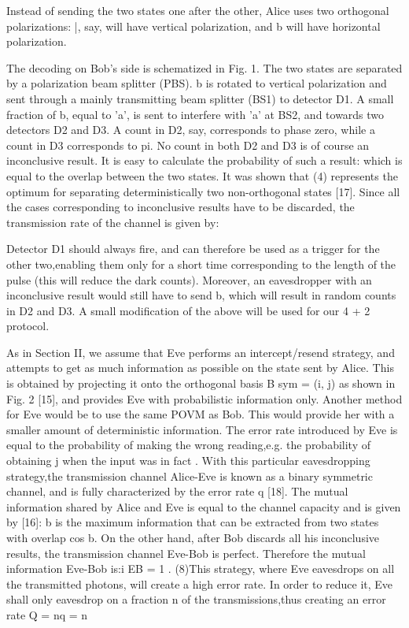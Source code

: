 Instead of sending the two states one after the other, Alice uses two orthogonal polarizations: |, say, will have vertical polarization, and b will have horizontal polarization.

The decoding on Bob’s side is schematized in Fig. 1. The two states are separated by a polarization beam splitter (PBS). b is rotated to vertical polarization and sent through a mainly transmitting beam splitter (BS1) to detector D1. A small fraction of b, equal to 'a', is sent to interfere with 'a' at BS2, and towards two detectors D2 and D3. A count in D2, say, corresponds to phase zero, while a count in D3 corresponds to pi. No count in both D2 and D3 is of course an inconclusive result. It is easy to calculate the probability of such a result: which is equal to the overlap between the two states. It was shown that (4) represents the optimum for separating deterministically two non-orthogonal states [17]. Since all the cases corresponding to inconclusive results have to be discarded, the transmission rate of the channel is given by:

Detector D1 should always fire, and can therefore be used as a trigger for the other two,enabling them only for a short time corresponding to the length of the pulse (this will reduce the dark counts). Moreover, an eavesdropper with an inconclusive result would still have to send b, which will result in random counts in D2 and D3. A small modification of the above will be used for our 4 + 2 protocol.

As in Section II, we assume that Eve performs an intercept/resend strategy, and attempts to get as much information as possible on the state sent by Alice. This is obtained by projecting it onto the orthogonal basis B sym = (i, j) as shown in Fig. 2 [15], and provides Eve with probabilistic information only. Another method for Eve would be to use the same POVM as Bob. This would provide her with a smaller amount of deterministic information.
The error rate introduced by Eve is equal to the probability of making the wrong reading,e.g. the probability of obtaining j when the input was in fact . With this particular eavesdropping strategy,the transmission channel Alice-Eve is known as a binary symmetric channel, and is fully characterized by the error rate q [18]. The mutual information shared by Alice and Eve is equal to the channel capacity and is given by [16]:
b is the maximum information that can be extracted from two states with overlap cos b. On the other hand, after Bob discards all his inconclusive results, the transmission channel Eve-Bob is perfect. Therefore the mutual information Eve-Bob is:i EB = 1 .
(8)This strategy, where Eve eavesdrops on all the transmitted photons, will create a high error rate. In order to reduce it, Eve shall only eavesdrop on a fraction n of the transmissions,thus creating an error rate Q = nq = n

